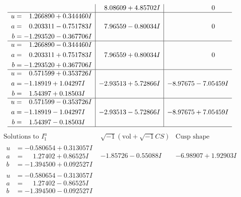 \documentclass[1p]{elsarticle_modified}
\theoremstyle{definition}
\newcommand{\I}{\sqrt{-1}}
\begin{document}
$$\begin{array}{c|c|c}
 & \phantom{-}8.08609 + 4.85702 I & \phantom{-0.000000 } 0 \\ \hline\begin{aligned}
u &= \phantom{-}1.266890 + 0.344460 I \\
a &= \phantom{-}0.203311 - 0.751783 I \\
b &= -1.293520 - 0.367706 I\end{aligned}
 & \phantom{-}7.96559 - 0.80034 I & \phantom{-0.000000 } 0 \\ \hline\begin{aligned}
u &= \phantom{-}1.266890 - 0.344460 I \\
a &= \phantom{-}0.203311 + 0.751783 I \\
b &= -1.293520 + 0.367706 I\end{aligned}
 & \phantom{-}7.96559 + 0.80034 I & \phantom{-0.000000 } 0 \\ \hline\begin{aligned}
u &= \phantom{-}0.571599 + 0.353726 I \\
a &= -1.18919 + 1.04297 I \\
b &= \phantom{-}1.54397 + 0.18503 I\end{aligned}
 & -2.93513 + 5.72866 I & -8.97675 - 7.05459 I \\ \hline\begin{aligned}
u &= \phantom{-}0.571599 - 0.353726 I \\
a &= -1.18919 - 1.04297 I \\
b &= \phantom{-}1.54397 - 0.18503 I\end{aligned}
 & -2.93513 - 5.72866 I & -8.97675 + 7.05459 I\\
 \hline 
 \end{array}$$\newpage$$\begin{array}{c|c|c}  
\text{Solutions to }I^u_{1}& \I (\text{vol} + \sqrt{-1}CS) & \text{Cusp shape}\\
 \hline 
\begin{aligned}
u &= -0.580654 + 0.313057 I \\
a &= \phantom{-}1.27402 + 0.86525 I \\
b &= -1.394500 + 0.092527 I\end{aligned}
 & -1.85726 - 0.55088 I & -6.98907 + 1.92903 I \\ \hline\begin{aligned}
u &= -0.580654 - 0.313057 I \\
a &= \phantom{-}1.27402 - 0.86525 I \\
b &= -1.394500 - 0.092527 I\end{aligned}

\end{array}$$
\end{document}
